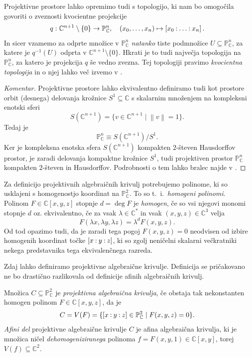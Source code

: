 \documentclass[mat1]{fmfdelo}
\numberwithin{equation}{section}
\newcommand{\C}{\mathbb C}
\newcommand{\PP}{\mathbb P}
\newcommand{\CM}{\mathbb C ^*}
\newcommand{\PC}{\mathbb{P}^2_\C}
\newcommand{\inv}{^{-1}}
\newcommand{\pcoor}[1]{%
\begingroup\lccode`~=`: \lowercase{\endgroup
\edef~}{\mathbin{\mathchar\the\mathcode`:}\nobreak}%
\left[%
\begingroup
\mathcode`:=\string"8000
#1%
\endgroup
\right]%
}
\theoremstyle{definition}
\newenvironment{komentar}[1][Komentar]{\begin{proof}[#1]\let\qed\relax}{\end{proof}}
\begin{document}
\begin{opomba} 
    \label{topologija na projektivnih prostorih}   
    Projektivne prostore lahko opremimo tudi s topologijo, ki nam bo omogočila govoriti o zveznosti kvocientne projekcije
    \[
        q : \C^{n+1}\setminus\{0\} \to \PP_\C^n, \quad (x_0, \ldots, x_n) \mapsto \pcoor{x_0 : \ldots : x_n}. 
    \]
    In sicer vzamemo za odprte množice v $\PP_\C^n$ \emph{natanko} tiste podmnožice $U \subseteq \PP_\C^n$, za katere je $q\inv(U)$ odprta v $\C^{n+1}\setminus\{0\}$. Hkrati je to tudi največja topologija na $\PP_\C^n$, za katero je projekcija $q$ še vedno zvezna.  
    Tej topologiji pravimo \emph{kvocientna topologija} in o njej lahko več izvemo v \cite[poglavje 3.2]{MrcunTop}.
\end{opomba}

\begin{komentar}
    Projektivne prostore lahko ekvivalentno definiramo tudi kot prostore orbit (desnega) delovanja krožnice $S^1 \subseteq \C$ s skalarnim množenjem na kompleksni enotski sferi 
    \[
        S(\C^{n+1}) = \{v \in \C^{n+1} \mid \left\lVert v\right\rVert = 1\}.
    \]
    Tedaj je
    \[
        \PP_\C^n \equiv S(\C^{n+1})/S^1.
    \]
    Ker je kompleksna enotska sfera $S(\C^{n+1})$ kompakten $2$-števen Hausdorffov prostor, je zaradi delovanja kompaktne krožnice $S^1$, tudi projektiven prostor $\PP_\C^n$ kompakten $2$-števen in Hausdorffov. Podrobnosti o tem lahko bralec najde v 
    \cite[zgled 3.43]{MrcunTop}.
\end{komentar}

Za definicijo projektivnih algebraičnih krivulj potrebujemo  polinome, ki so usklajeni s homogenostjo koordinat na $\PC$. To so t.~i.\ \emph{homogeni polinomi}. Polinom $F \in \C[x,y,z]$ stopnje $d = \deg F$ je \emph{homogen}, če so vsi njegovi monomi stopnje $d$ oz. ekvivalentno, če za vsak $\lambda \in \CM$ in vsak $(x,y,z) \in \C^3$ velja
\[
    F(\lambda x, \lambda y, \lambda z) = \lambda^d F(x,y,z). 
\]
Od tod opazimo tudi, da je zaradi tega pogoj $F(x,y,z) = 0$ neodvisen od izbire homogenih koordinat točke $\pcoor{x : y : z}$, ki so zgolj neničelni skalarni večkratniki nekega predstavnika tega ekvivalenčnega razreda.  

Zdaj lahko definiramo projektivne algebraične krivulje. Definicija se pričakovano ne bo drastično razlikovala od definicije afinih algebraičnih krivulj.

\begin{definicija}
    Množica $C \subseteq \PC$ je \emph{projektivna algebraična krivulja}, če obstaja tak nekonstanten homogen polinom $F \in \C[x,y,z]$, da je
    \[
        C = V(F) = \{\pcoor{x: y: z} \in \PC \mid F(x,y,z) = 0\}. 
    \]
    \emph{Afini del} projektivne algebraične krivulje $C$ je afina algebraična krivulja, ki je množica ničel \emph{dehomogeniziranega} polinoma $f = F(x,y,1) \in \C[x,y]$, torej $V(f) \subseteq \C^2$. 
\end{definicija}
\end{document}
